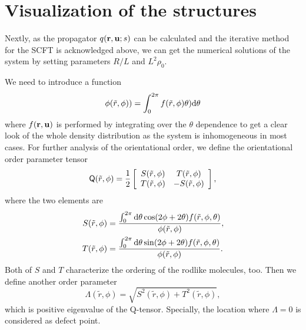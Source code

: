 \documentclass[prl,twocolumn,preprintnumbers,reprint]{revtex4}
\newcommand{\bu}{{\bf u}}
\newcommand{\br}{{\bf r}}
\newcommand{\rd}{{\rm d}}
\begin{document}
\section{Visualization of the structures}
Nextly, as the propagator $q(\br,\bu;s)$ can be calculated and the iterative method for the SCFT is acknowledged above, we can get the numerical solutions of the system by setting parameters $R/L$ and $L^2\rho_0$.

We need to introduce a function
\begin{equation}
\phi(\tilde{r},\phi))=\int_0^{2\pi}f(\tilde{r},\phi)\theta)\rd\theta
\end{equation}
where $f(\br,\bu)$ is performed by integrating over the $\theta$ dependence to get a clear look of the whole density distribution as the system is inhomogeneous in most cases. For further analysis of the orientational order, we define the orientational order parameter tensor
\begin{equation}  \label{Qdef}
  \begin{split}
    {\sf Q}(\tilde{r},\phi) &= {1\over 2} \left[\begin{array}{cc}
      S(\tilde{r},\phi) & T(\tilde{r},\phi)\\
      T(\tilde{r},\phi) & -S(\tilde{r},\phi)
    \end{array}\right],\\
  \end{split}
\end{equation}
where the two elements are
\begin{align}
S(\tilde{r},\phi)&=\frac{\int_0^{2\pi}\rd\theta\cos(2\phi+2\theta)f(\tilde{r},\phi,\theta)}{\phi(\tilde{r},\phi)},\\
T(\tilde{r},\phi)&=\frac{\int_0^{2\pi}\rd\theta\sin(2\phi+2\theta)f(\tilde{r},\phi,\theta)}{\phi(\tilde{r},\phi)}.
\end{align}
Both of $S$ and $T$ characterize the ordering of the rodlike molecules, too. Then we define another order parameter
\begin{equation}\label{lambda}
\Lambda(\tilde{r},\phi)= \sqrt{S^2(\tilde{r},\phi)+T^2(\tilde{r},\phi)},
\end{equation}
which is positive eigenvalue of the Q-tensor. Specially, the location where $\Lambda=0$ is considered as defect point.
\end{document}
